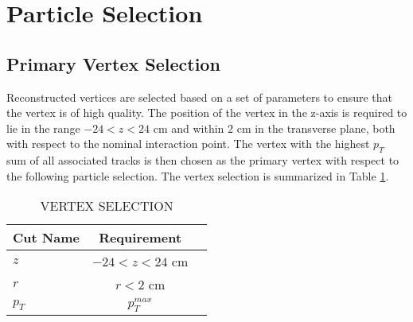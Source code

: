 \section{Particle Selection}
\label{sec:particleselection}

\subsection{Primary Vertex Selection}
\label{sec:vertexselection}
Reconstructed vertices are selected based on a set of parameters to ensure that the vertex is of high quality.
The position of the vertex in the z-axis is required to lie in the range $-24 < z < 24$ cm and within $2$ cm in the transverse plane, both with respect to the nominal interaction point. 
The vertex with the highest $p_{T}$ sum of all associated tracks is then chosen as the primary vertex with respect to the following particle selection.
The vertex selection is summarized in Table \ref{tab:vertexselection}.

\begin{table}[htpb]
  \setlength{\capwidth}{0.9\textwidth}
  \begin{small}
  \begin{center}
    \caption{VERTEX SELECTION}
    \label{tab:vertexselection}
    \begin{tabular}{lcc}
      \toprule
      Cut Name & Requirement \\
      \midrule
      $z$     & $-24 < z < 24$ cm \\
      $r$     & $r < 2$ cm \\ 
      $p_{T}$ & $p_{T}^{max}$ \\
      \bottomrule
    \end{tabular}
  \end{center}
  \end{small}
\end{table}


